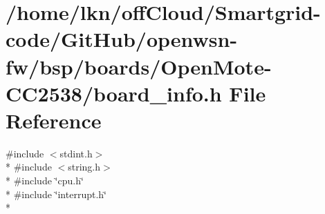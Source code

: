 \hypertarget{_open_mote-_c_c2538_2board__info_8h}{}\section{/home/lkn/off\+Cloud/\+Smartgrid-\/code/\+Git\+Hub/openwsn-\/fw/bsp/boards/\+Open\+Mote-\/\+C\+C2538/board\+\_\+info.h File Reference}
\label{_open_mote-_c_c2538_2board__info_8h}
{\ttfamily \#include $<$stdint.\+h$>$}\\*
{\ttfamily \#include $<$string.\+h$>$}\\*
{\ttfamily \#include \char`\"{}cpu.\+h\char`\"{}}\\*
{\ttfamily \#include \char`\"{}interrupt.\+h\char`\"{}}\\*
